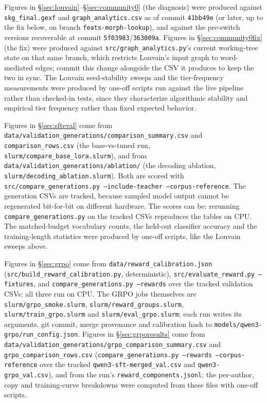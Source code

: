 \documentclass[11pt]{article}
\begin{document}
Figures in \S\ref{sec:louvain}--\S\ref{sec:community0} (the diagnosis) were
produced against \texttt{skg\_final.gexf} and \texttt{graph\_analytics.csv}
as of commit \texttt{41bb49e} (or later, up to the fix below, on branch
\texttt{feats-morph-lookup}), and against the pre-switch versions recoverable
at commit \texttt{5f03983}/\texttt{363009a}. Figures in
\S\ref{sec:community0fix} (the fix) were produced against
\texttt{src/graph\_analytics.py}'s current working-tree state on that same
branch, which restricts Louvain's input graph to word-mediated edges; commit
this change alongside the CSV it produces to keep the two in sync. The
Louvain seed-stability sweeps and the tier-frequency measurements were
produced by one-off scripts run against the live pipeline rather than
checked-in tests, since they characterize algorithmic stability and
empirical tier frequency rather than fixed expected behavior.

Figures in \S\ref{sec:sfteval} come from
\texttt{data/validation\_generations/comparison\_summary.csv} and
\texttt{comparison\_rows.csv} (the base-vs-tuned run,
\texttt{slurm/compare\_base\_lora.slurm}), and from
\texttt{data/validation\_generations/ablation/} (the decoding ablation,
\texttt{slurm/decoding\_ablation.slurm}). Both are scored with
\texttt{src/compare\_generations.py --include-teacher --corpus-reference}.
The generation CSVs are tracked, because sampled model output cannot be
regenerated bit-for-bit on different hardware. The scores can be: rerunning
\texttt{compare\_generations.py} on the tracked CSVs reproduces the tables on
CPU. The matched-budget vocabulary counts, the held-out classifier accuracy
and the training-length statistics were produced by one-off scripts, like
the Louvain sweeps above.

Figures in \S\ref{sec:grpo} come from \texttt{data/reward\_calibration.json}
(\texttt{src/build\_reward\_calibration.py}, deterministic),
\texttt{src/evaluate\_reward.py --fixtures}, and
\texttt{compare\_generations.py --rewards} over the tracked validation CSVs;
all three run on CPU. The GRPO jobs themselves are
\texttt{slurm/grpo\_smoke.slurm}, \texttt{slurm/reward\_groups.slurm},
\texttt{slurm/train\_grpo.slurm} and \texttt{slurm/eval\_grpo.slurm}; each
run writes its arguments, git commit, merge provenance and calibration hash
to \texttt{models/qwen3-grpo/run\_config.json}. Figures in
\S\ref{sec:grporesults} come from
\texttt{data/validation\_generations/grpo\_comparison\_summary.csv} and
\texttt{grpo\_comparison\_rows.csv} (\texttt{compare\_generations.py
--rewards --corpus-reference} over the tracked \texttt{qwen3-sft-merged\_val.csv}
and \texttt{qwen3-grpo\_val.csv}), and from the run's
\texttt{reward\_components.jsonl}; the per-author, copy and training-curve
breakdowns were computed from these files with one-off scripts.
\end{document}
